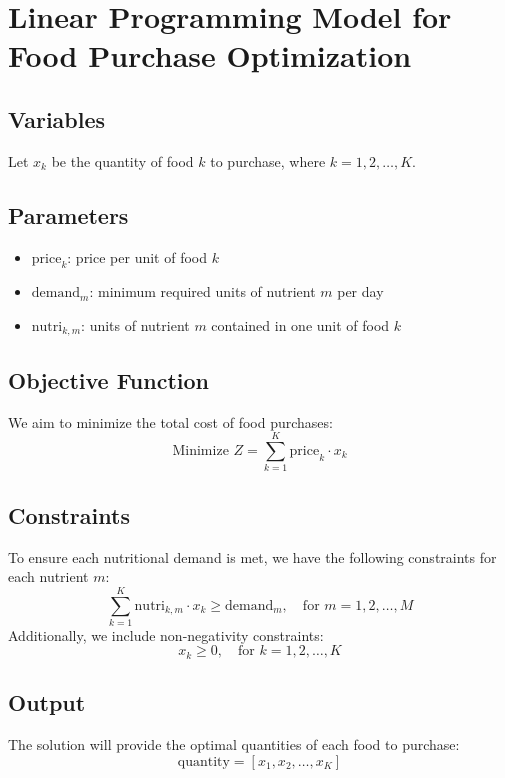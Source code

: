 \documentclass{article}
\begin{document}
\section*{Linear Programming Model for Food Purchase Optimization}

\subsection*{Variables}
Let \( x_k \) be the quantity of food \( k \) to purchase, where \( k = 1, 2, \ldots, K \).

\subsection*{Parameters}
\begin{itemize}
    \item \( \text{price}_k \): price per unit of food \( k \)
    \item \( \text{demand}_m \): minimum required units of nutrient \( m \) per day
    \item \( \text{nutri}_{k,m} \): units of nutrient \( m \) contained in one unit of food \( k \)
\end{itemize}

\subsection*{Objective Function}
We aim to minimize the total cost of food purchases:
\[
\text{Minimize } Z = \sum_{k=1}^{K} \text{price}_k \cdot x_k
\]

\subsection*{Constraints}
To ensure each nutritional demand is met, we have the following constraints for each nutrient \( m \):
\[
\sum_{k=1}^{K} \text{nutri}_{k,m} \cdot x_k \geq \text{demand}_m, \quad \text{for } m = 1, 2, \ldots, M
\]
Additionally, we include non-negativity constraints:
\[
x_k \geq 0, \quad \text{for } k = 1, 2, \ldots, K
\]

\subsection*{Output}
The solution will provide the optimal quantities of each food to purchase:
\[
\text{quantity} = [x_1, x_2, \ldots, x_K]
\]
\end{document}
